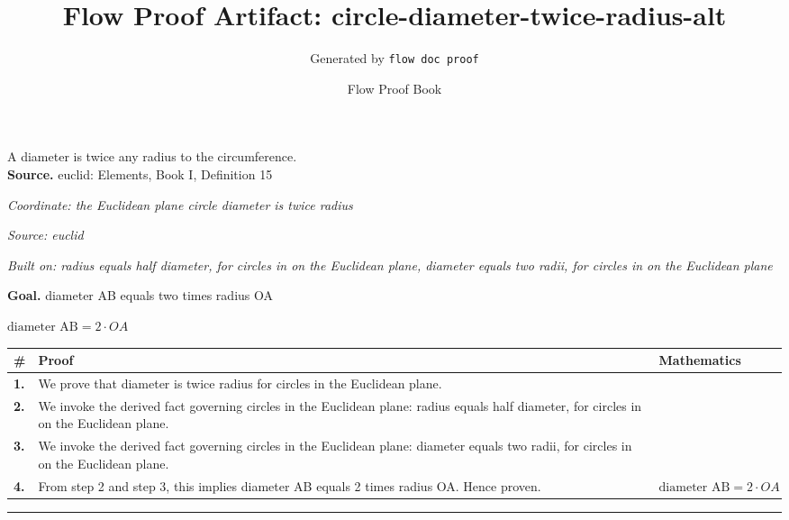 \documentclass[11pt]{article}
\title{Flow Proof Artifact: circle-diameter-twice-radius-alt}
\author{Generated by \texttt{flow doc proof}}
\date{Flow Proof Book}
\theoremstyle{definition}
\begin{document}
\maketitle
A diameter is twice any radius to the circumference.\\[0.5em]
\textbf{Source.} euclid: Elements, Book I, Definition 15\\[0.5em]
\bigskip
{}\par
\smallskip\noindent\textit{Coordinate: the Euclidean plane \cdot circle \cdot diameter is twice radius}\par
\smallskip\noindent\textit{Source: euclid}\par
\smallskip\noindent\textit{Built on: radius equals half diameter, for circles in on the Euclidean plane, diameter equals two radii, for circles in on the Euclidean plane}\par
\medskip
\noindent\textbf{Goal.} diameter AB equals two times radius OA\par
\noindent$\displaystyle \text{diameter AB} = 2 \cdot OA$\par
\medskip
\noindent
\begin{tabular}{@{} >{\raggedright\arraybackslash}p{} >{\raggedright\arraybackslash}p{} >{\raggedleft\arraybackslash}p{} @{}}
\textbf{\#} & \textbf{Proof} & \textbf{Mathematics} \\
\midrule
\textbf{1.} & We prove that diameter is twice radius for circles in the Euclidean plane. & \\[0.45em]
\textbf{2.} & We invoke the derived fact governing circles in the Euclidean plane: radius equals half diameter, for circles in on the Euclidean plane. & \\[0.45em]
\textbf{3.} & We invoke the derived fact governing circles in the Euclidean plane: diameter equals two radii, for circles in on the Euclidean plane. & \\[0.45em]
\textbf{4.} & From step 2 and step 3, this implies diameter AB equals 2 times radius OA. Hence proven. & $\displaystyle \text{diameter AB} = 2 \cdot OA$ \\[0.45em]
\bottomrule
\end{tabular}
\label{thm:Geometry-circle-diameter_is_twice_radius}
\par\medskip\hrule
\end{document}
